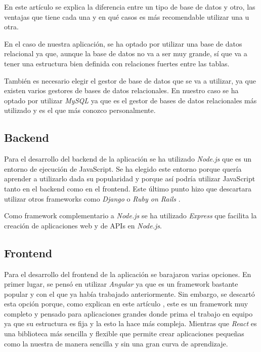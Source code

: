 En este artículo \cite{relational-vs-non-relational} se explica la diferencia entre
un tipo de base de datos y otro, las ventajas que tiene cada una y en qué casos es
más recomendable utilizar una u otra.

En el caso de nuestra aplicación, se ha optado por utilizar una base de datos relacional
ya que, aunque la base de datos no va a ser muy grande, sí que va a tener una estructura
bien definida con relaciones fuertes entre las tablas.

También es necesario elegir el gestor de base de datos que se va a utilizar, ya que
existen varios gestores de bases de datos relacionales. En nuestro caso se ha optado
por utilizar \textit{MySQL} \cite{mysql} ya que es el gestor de bases de datos
relacionales más utilizado y es el que más conozco personalmente.

\subsection{Backend}
Para el desarrollo del backend de la aplicación se ha utilizado \textit{Node.js}
\cite{nodejs} que es un entorno de ejecución de JavaScript. Se ha elegido este
entorno porque quería aprender a utilizarlo dada su popularidad y porque así podría
utilizar JavaScript tanto en el backend como en el frontend. Este último punto
hizo que descartara utilizar otros frameworks como \textit{Django} \cite{django}
o \textit{Ruby on Rails} \cite{ruby-on-rails}.

Como framework complementario a \textit{Node.js} se ha utilizado \textit{Express}
\cite{express} que facilita la creación de aplicaciones web y de APIs en \textit{Node.js}.

\subsection{Frontend}
Para el desarrollo del frontend de la aplicación se barajaron varias opciones.
En primer lugar, se pensó en utilizar \textit{Angular} \cite{angular} ya que es un
framework bastante popular y con el que ya había trabajado anteriormente. Sin embargo,
se descartó esta opción porque, como explican en este artículo \cite{angular-vs-react},
este es un framework muy completo y pensado para aplicaciones grandes donde prima el
trabajo en equipo ya que su estructura es fija y la esto la hace más compleja. Mientras
que \textit{React} \cite{react} es una biblioteca más sencilla y flexible que permite
crear aplicaciones pequeñas como la nuestra de manera sencilla y sin una gran curva de
aprendizaje.

